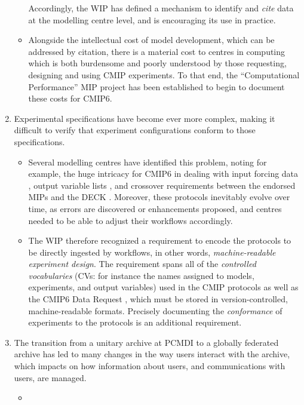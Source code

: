 \documentclass[gmd,manuscript]{copernicus}
\newcommand{\pipref}[1] {\citep{ref:#1}}
\begin{document}
\begin{enumerate}
\begin{itemize}
  Accordingly, the WIP has defined a mechanism to identify
  and \emph{cite} data at the modelling centre level, and is encouraging its use in practice. 
  \item Alongside the intellectual cost of model development, which
  can be addressed by citation, there is a material cost to centres in computing
  which is both burdensome and poorly understood by those requesting, designing
  and using CMIP experiments. To that end, 
  the ``Computational Performance'' MIP project
  \pipref{balajietal2017}  has been established to begin to document these costs for
  CMIP6.
  \end{itemize}
\item\label{cmplx} Experimental specifications have become ever more
complex, making it difficult to verify that experiment configurations
conform to those specifications.
 \begin{itemize} 
 \item Several modelling centres have identified this problem, noting
 for example, the huge intricacy for CMIP6 in dealing with  input forcing data \citep[fsee][]{ref:duracketal2017},
  output variable lists \pipref{juckesetal2015}, and
  crossover requirements between the endorsed MIPs and the DECK
  \pipref{eyringetal2016a} . Moreover,
  these  protocols inevitably evolve over time, as errors are discovered
  or enhancements proposed, and centres needed to be able to adjust
  their workflows accordingly. 
  \item The WIP therefore recognized a
  requirement to encode the protocols to be directly ingested by
  workflows, in other words, \emph{machine-readable experiment
    design}. The requirement spans all of the \emph{controlled
    vocabularies} (CVs: for instance the names assigned to models,
  experiments, and output variables) used in the CMIP protocols as
  well as the CMIP6 Data Request \pipref{juckesetal2015}, which must
  be stored in version-controlled, machine-readable formats. Precisely
  documenting the \emph{conformance} of experiments to the protocols
  \pipref{lawrenceetal2012} is an additional requirement.
  \end{itemize}
\item\label{snap} The transition from a
  unitary archive at PCMDI to a globally federated archive has led to many changes
  in the way users interact with the archive, which impacts on how information
  about users, and communications with users, are managed.
  \begin{itemize}
  \item 

\end{itemize}
\end{enumerate}
\end{document}
